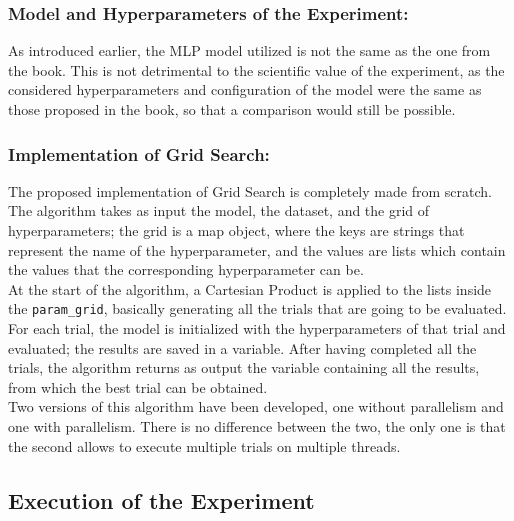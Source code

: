 \subsubsection{Model and Hyperparameters of the Experiment:}
As introduced earlier, the MLP model utilized is not the same as the one from the book. This is not detrimental to the scientific value of the experiment, as the considered hyperparameters and configuration of the model were the same as those proposed in the book, so that a comparison would still be possible.

\subsubsection{Implementation of Grid Search:}
The proposed implementation of Grid Search is completely made from scratch.
The algorithm takes as input the model, the dataset, and the grid of hyperparameters; the grid is a map object, where the keys are strings that represent the name of the hyperparameter, and the values are lists which contain the values that the corresponding hyperparameter can be.
\\[0.3cm]At the start of the algorithm, a Cartesian Product is applied to the lists inside the \texttt{param\_grid}, basically generating all the trials that are going to be evaluated.
For each trial, the model is initialized with the hyperparameters of that trial and evaluated; the results are saved in a variable.
After having completed all the trials, the algorithm returns as output the variable containing all the results, from which the best trial can be obtained.
\\[0.3cm]Two versions of this algorithm have been developed, one without parallelism and one with parallelism. There is no difference between the two, the only one is that the second allows to execute multiple trials on multiple threads.

\subsection{Execution of the Experiment}

